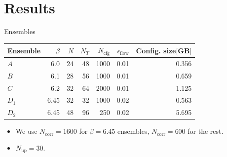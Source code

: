 \documentclass[10pt,show notes on second screen]{beamer}
\begin{document}
\section{Results}

\begin{frame}{Ensembles}
\begin{table}
    \centering
    \begin{tabular}{l r r r r r r}
        \toprule
        Ensemble & $\beta$ & $N$ & $N_T$ & $N_\mathrm{cfg}$ & $\epsilon_\mathrm{flow}$ & Config. size$[$GB$]$ \\ 
        \midrule
        $A$   & 6.0  & 24 & 48 & 1000 & 0.01 & 0.356 \\
        $B$   & 6.1  & 28 & 56 & 1000 & 0.01 & 0.659 \\
        $C$   & 6.2  & 32 & 64 & 2000 & 0.01 & 1.125 \\
        $D_1$ & 6.45 & 32 & 32 & 1000 & 0.02 & 0.563 \\
        $D_2$ & 6.45 & 48 & 96 & 250  & 0.02 & 5.695 \\
        \bottomrule
    \end{tabular}
\end{table}
\begin{itemize}[<+->]
    \item We use $N_\mathrm{corr}=1600$ for $\beta=6.45$ ensembles, $N_\mathrm{corr}=600$ for the rest.
    \item $N_\mathrm{up}=30$.
\end{itemize}
\end{frame}
\end{document}
